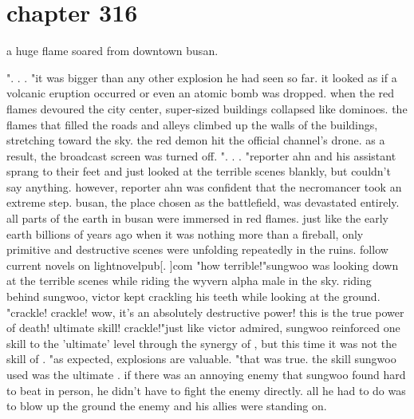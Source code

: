 \section{chapter 316}

a huge flame soared from downtown busan.





".
.
.
"it was bigger than any other explosion he had seen so far.
 it looked as if a volcanic eruption occurred or even an atomic bomb was dropped.
 when the red flames devoured the city center, super-sized buildings collapsed like dominoes.
 the flames that filled the roads and alleys climbed up the walls of the buildings, stretching toward the sky.
the red demon hit the official channel's drone.
as a result, the broadcast screen was turned off.
 ".
.
.
"reporter ahn and his assistant sprang to their feet and just looked at the terrible scenes blankly, but couldn't say anything.
 however, reporter ahn was confident that the necromancer took an extreme step.
busan, the place chosen as the battlefield, was devastated entirely.
all parts of the earth in busan were immersed in red flames.
 just like the early earth billions of years ago when it was nothing more than a fireball, only primitive and destructive scenes were unfolding repeatedly in the ruins.
follow current novels on lightnovelpub[.
]com "how terrible!"sungwoo was looking down at the terrible scenes while riding the wyvern alpha male in the sky.
 riding behind sungwoo, victor kept crackling his teeth while looking at the ground.
"crackle! crackle! wow, it's an absolutely destructive power! this is the true power of death! ultimate skill! crackle!"just like victor admired, sungwoo reinforced one skill to the 'ultimate' level through the synergy of , but this time it was not the skill of .
"as expected, explosions are valuable.
"that was true.
 the skill sungwoo used was the ultimate .
if there was an annoying enemy that sungwoo found hard to beat in person, he didn't have to fight the enemy directly.
 all he had to do was to blow up the ground the enemy and his allies were standing on.

